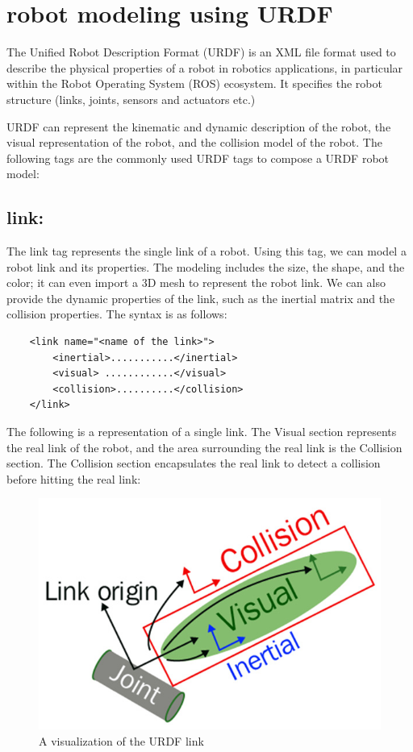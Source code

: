 \documentclass[../../main]{subfiles}
\begin{document}
\lstset{language=XML}

\section{robot modeling using URDF}
The Unified Robot Description Format (URDF) is an XML file format used to describe the physical properties of a robot in robotics applications, in particular within the Robot Operating System (ROS) ecosystem. It specifies the robot structure (links, joints, sensors and actuators etc.)

URDF can represent the kinematic and dynamic description of the robot, the visual
representation of the robot, and the collision model of the robot.
The following tags are the commonly used URDF tags to compose a URDF robot model:

\subsection{link:}\label{tags}
The link tag represents the single link of a robot. Using this tag, we can
model a robot link and its properties. The modeling includes the size, the shape,
and the color; it can even import a 3D mesh to represent the robot link. We can
also provide the dynamic properties of the link, such as the inertial matrix and the
collision properties.
The syntax is as follows:
\\
% 
\begin{verbatim}
    <link name="<name of the link>">
        <inertial>...........</inertial>
        <visual> ............</visual>
        <collision>..........</collision>
    </link>
\end{verbatim}
The following is a representation of a single link. The Visual section represents the
real link of the robot, and the area surrounding the real link is the Collision section.
The Collision section encapsulates the real link to detect a collision before hitting
the real link:
\begin{figure}[h]
\centering
\includegraphics{sublatex/hashem/img/link1.jpg}
\caption{A visualization of the URDF link\cite{joseph2018mastering}}
\end{figure}
\end{document}
